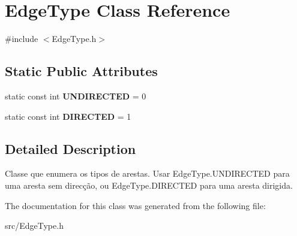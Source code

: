 \hypertarget{class_edge_type}{}\section{Edge\+Type Class Reference}
\label{class_edge_type}


{\ttfamily \#include $<$Edge\+Type.\+h$>$}

\subsection*{Static Public Attributes}
\begin{DoxyCompactItemize}
\item 
static const int {\bfseries U\+N\+D\+I\+R\+E\+C\+T\+ED} = 0\hypertarget{class_edge_type_a6533cc56d05c288a550b9980b66c9317}{}\label{class_edge_type_a6533cc56d05c288a550b9980b66c9317}

\item 
static const int {\bfseries D\+I\+R\+E\+C\+T\+ED} = 1\hypertarget{class_edge_type_a903017a534f2818c2d17145e4ae0321c}{}\label{class_edge_type_a903017a534f2818c2d17145e4ae0321c}

\end{DoxyCompactItemize}


\subsection{Detailed Description}
Classe que enumera os tipos de arestas. Usar Edge\+Type.\+U\+N\+D\+I\+R\+E\+C\+T\+ED para uma aresta sem direcção, ou Edge\+Type.\+D\+I\+R\+E\+C\+T\+ED para uma aresta dirigida. 

The documentation for this class was generated from the following file\+:\begin{DoxyCompactItemize}
\item 
src/Edge\+Type.\+h\end{DoxyCompactItemize}
